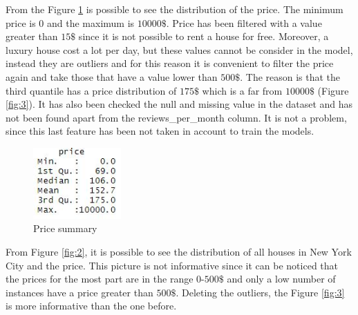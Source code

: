 \documentclass{FR16}
\begin{document}
From the Figure \ref{fig:1} is possible to see the distribution of the price. The minimum price is $0$ and the maximum is $10000\$$. Price has been filtered with a value greater than  $15\$$ since it is not possible to rent a house for free. Moreover, a luxury house cost a lot per day, but these values cannot be consider in the model, instead they are outliers and for this reason it is convenient to filter the price again and take those that have a value lower than $500\$$. The reason is that the third quantile has a price distribution of $175\$$ which is a far from $10000\$$ (Figure \ref{fig:3}). It has also been checked the null and missing value  in the dataset and has not been found apart from the reviews\_per\_month column. It is not a problem, since this last feature has been not taken in account to train the models. 
\\
\begin{figure}[H]
\centering
\includegraphics[width=0.3\textwidth]{figures/figure1.jpg} 
\caption{\label{fig:1}Price summary}
\end{figure}
\noindent From Figure \ref{fig:2}, it is possible to see the distribution of all houses in New York City and the price. This picture is not  informative since it can be noticed that the prices for the most part are in the range $0$-$500\$$ and only a low number of instances have a price greater than $500\$$. Deleting the outliers, the Figure \ref{fig:3} is more informative than the one before.
\end{document}
